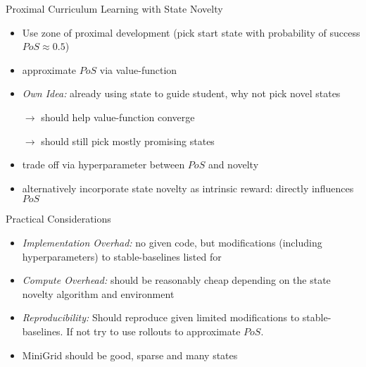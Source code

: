 \documentclass[12pt]{beamer}
\begin{document}
\begin{frame}{Proximal Curriculum Learning with State Novelty}
  \begin{itemize}
    \item Use zone of proximal development (pick start state with probability of success $PoS \approx 0.5$) \parencite{proximal}
    \item approximate $PoS$ via value-function \parencite{proximal}
      \pause
    \item \textit{Own Idea:} already using state to guide student, why not pick novel states
    \item[$\rightarrow$] should help value-function converge
    \item[$\rightarrow$] should still pick mostly promising states
      \pause
    \item trade off via hyperparameter between $PoS$ and novelty
    \item alternatively incorporate state novelty as intrinsic reward: directly influences $PoS$
  \end{itemize}
\end{frame}

\begin{frame}{Practical Considerations}
  \begin{itemize}
    \item \textit{Implementation Overhad:} no given code, but modifications (including hyperparameters) to stable-baselines listed for \parencite{proximal}
      \pause
    \item \textit{Compute Overhead:} should be reasonably cheap depending on the state novelty algorithm and environment
      \pause
    \item \textit{Reproducibility:} Should reproduce given limited modifications to stable-baselines. If not try to use rollouts to approximate $PoS$.
      \pause
    \item MiniGrid should be good, sparse and many states
  \end{itemize}
\end{frame}
\end{document}
